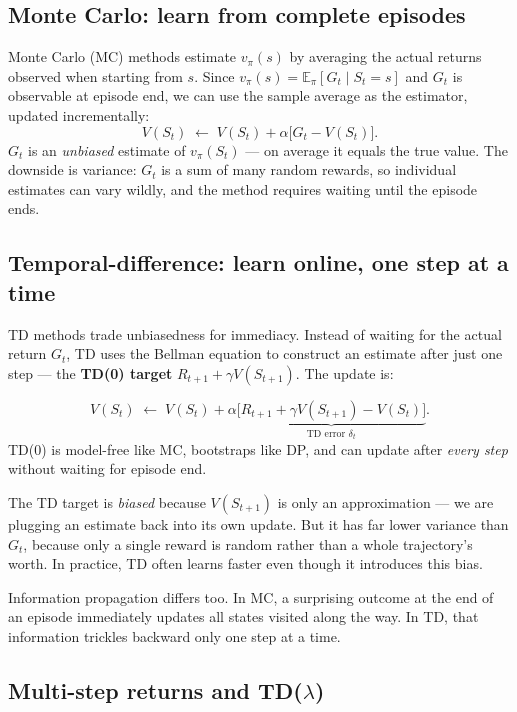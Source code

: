 \documentclass[11pt, oneside]{book}
\newcommand{\E}{\mathbb{E}}              %
\newcommand{\vpi}{v_{\pi}}               %
\begin{document}
\subsection{Monte Carlo: learn from complete episodes}

Monte Carlo (MC) methods estimate $\vpi(s)$ by averaging the actual returns
observed when starting from $s$.
Since $\vpi(s) = \E_\pi[G_t \mid S_t = s]$ and $G_t$ is observable at episode
end, we can use the sample average as the estimator, updated incrementally:
\[
  V(S_t) \;\leftarrow\; V(S_t) + \alpha\bigl[G_t - V(S_t)\bigr].
\]
$G_t$ is an \emph{unbiased} estimate of $\vpi(S_t)$ --- on average it equals
the true value.
The downside is variance: $G_t$ is a sum of many random rewards, so individual
estimates can vary wildly, and the method requires waiting until the episode ends.

\subsection{Temporal-difference: learn online, one step at a time}

TD methods trade unbiasedness for immediacy.
Instead of waiting for the actual return $G_t$, TD uses the Bellman equation
to construct an estimate after just one step --- the \textbf{TD(0) target}
$R_{t+1} + \gamma V(S_{t+1})$.
The update is:

\begin{thmbox}[title={TD(0) Update Rule}]
\[
  V(S_t) \;\leftarrow\; V(S_t)
  + \alpha\underbrace{\bigl[R_{t+1} + \gamma V(S_{t+1}) - V(S_t)\bigr]}_{\text{TD error } \delta_t}.
\]
TD(0) is model-free like MC, bootstraps like DP, and can update after
\emph{every step} without waiting for episode end.
\end{thmbox}

The TD target is \emph{biased} because $V(S_{t+1})$ is only an approximation ---
we are plugging an estimate back into its own update.
But it has far lower variance than $G_t$, because only a single reward is
random rather than a whole trajectory's worth.
In practice, TD often learns faster even though it introduces this bias.

Information propagation differs too.
In MC, a surprising outcome at the end of an episode immediately updates all
states visited along the way.
In TD, that information trickles backward only one step at a time.

\subsection{Multi-step returns and TD($\lambda$)}
\end{document}
